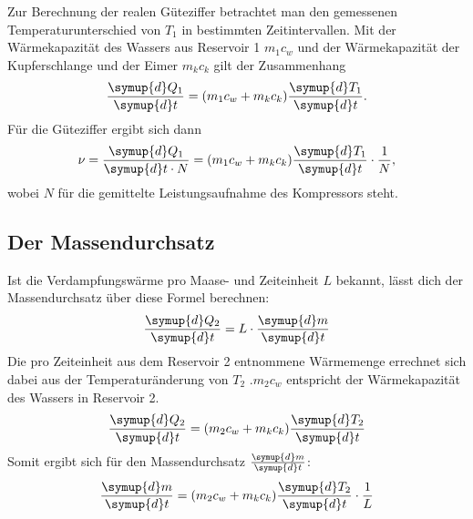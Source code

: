 Zur Berechnung der realen Güteziffer betrachtet man den gemessenen Temperaturunterschied von $T_1$ in bestimmten Zeitintervallen.
Mit der Wärmekapazität des Wassers aus Reservoir 1 $m_1c_w$ und der Wärmekapazität der Kupferschlange und der Eimer $m_kc_k$ gilt der Zusammenhang
\begin{equation}
    \frac{\symup{d}Q_1}{\symup{d}t} = (m_1c_w + m_kc_k) \frac{\symup{d}T_1}{\symup{d}t}.
\end{equation}
Für die Güteziffer ergibt sich dann 
\begin{equation}\label{eqn:gueteziffer}
    \nu = \frac{\symup{d}Q_1}{\symup{d}t \cdot N} = (m_1c_w + m_kc_k) \frac{\symup{d}T_1}{\symup{d}t} \cdot \frac{1}{N},
\end{equation}
wobei $N$ für die gemittelte Leistungsaufnahme des Kompressors steht.

\subsection{Der Massendurchsatz}
Ist die Verdampfungswärme pro Maase- und Zeiteinheit $L$ bekannt, lässt dich der Massendurchsatz über diese Formel berechnen:
\begin{equation}
    \frac{\symup{d}Q_2}{\symup{d}t} = L \cdot \frac{\symup{d}m}{\symup{d}t}
\end{equation}
Die pro Zeiteinheit aus dem Reservoir 2 entnommene Wärmemenge errechnet sich dabei aus der Temperaturänderung von $T_2$ .$m_2c_w$ entspricht der Wärmekapazität des Wassers in Reservoir 2.
\begin{equation}
    \frac{\symup{d}Q_2}{\symup{d}t} = (m_2c_w + m_kc_k) \frac{\symup{d}T_2}{\symup{d}t}
\end{equation}
Somit ergibt sich für den Massendurchsatz $\frac{\symup{d}m}{\symup{d}t}$:
\begin{equation}
    \frac{\symup{d}m}{\symup{d}t} = (m_2c_w + m_kc_k) \frac{\symup{d}T_2}{\symup{d}t} \cdot \frac{1}{L}
\end{equation}

